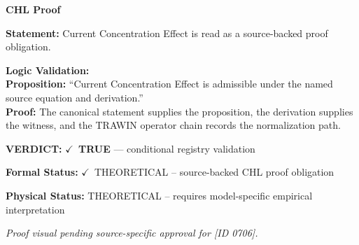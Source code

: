 \vspace{0.45em}
\noindent\textbf{CHL Proof}\par
\textbf{Statement:} Current Concentration Effect is read as a source-backed proof obligation.

\textbf{Logic Validation:}\\
\textbf{Proposition:} ``Current Concentration Effect is admissible under the named source equation and derivation.''\\
\textbf{Proof:} The canonical statement supplies the proposition, the derivation supplies the witness, and the TRAWIN operator chain records the normalization path.

\textbf{VERDICT:} \ensuremath{\checkmark}\ \textbf{TRUE} --- conditional registry validation

\textbf{Formal Status:} \ensuremath{\checkmark}\ THEORETICAL -- source-backed CHL proof obligation

\textbf{Physical Status:} THEORETICAL -- requires model-specific empirical interpretation
\par\vspace{0.45em}
\par
\vfill
\begingroup\footnotesize\itshape
Proof visual pending source-specific approval for [ID 0706].
\par\endgroup
\vfill
\endgroup
\endgroup
